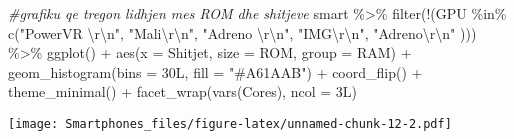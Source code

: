 \documentclass[
]{article}
\newenvironment{Shaded}{\begin{snugshade}}{\end{snugshade}}
\newcommand{\AttributeTok}[1]{\textcolor[rgb]{0.77,0.63,0.00}{#1}}
\newcommand{\CommentTok}[1]{\textcolor[rgb]{0.56,0.35,0.01}{\textit{#1}}}
\newcommand{\FunctionTok}[1]{\textcolor[rgb]{0.00,0.00,0.00}{#1}}
\newcommand{\NormalTok}[1]{#1}
\newcommand{\SpecialCharTok}[1]{\textcolor[rgb]{0.00,0.00,0.00}{#1}}
\newcommand{\StringTok}[1]{\textcolor[rgb]{0.31,0.60,0.02}{#1}}
\begin{document}
\begin{Shaded}
\begin{Highlighting}[]
\CommentTok{\#grafiku qe tregon lidhjen mes ROM dhe shitjeve}
\NormalTok{smart }\SpecialCharTok{\%\textgreater{}\%}
 \FunctionTok{filter}\NormalTok{(}\SpecialCharTok{!}\NormalTok{(GPU }\SpecialCharTok{\%in\%} \FunctionTok{c}\NormalTok{(}\StringTok{"PowerVR }\SpecialCharTok{\textbackslash{}r\textbackslash{}n}\StringTok{"}\NormalTok{, }\StringTok{"Mali}\SpecialCharTok{\textbackslash{}r\textbackslash{}n}\StringTok{"}\NormalTok{, }\StringTok{"Adreno }\SpecialCharTok{\textbackslash{}r\textbackslash{}n}\StringTok{"}\NormalTok{, }\StringTok{"IMG}\SpecialCharTok{\textbackslash{}r\textbackslash{}n}\StringTok{"}\NormalTok{, }\StringTok{"Adreno}\SpecialCharTok{\textbackslash{}r\textbackslash{}n}\StringTok{"}
\NormalTok{))) }\SpecialCharTok{\%\textgreater{}\%}
 \FunctionTok{ggplot}\NormalTok{() }\SpecialCharTok{+}
 \FunctionTok{aes}\NormalTok{(}\AttributeTok{x =}\NormalTok{ Shitjet, }\AttributeTok{size =}\NormalTok{ ROM, }\AttributeTok{group =}\NormalTok{ RAM) }\SpecialCharTok{+}
 \FunctionTok{geom\_histogram}\NormalTok{(}\AttributeTok{bins =}\NormalTok{ 30L, }\AttributeTok{fill =} \StringTok{"\#A61AAB"}\NormalTok{) }\SpecialCharTok{+}
 \FunctionTok{coord\_flip}\NormalTok{() }\SpecialCharTok{+}
 \FunctionTok{theme\_minimal}\NormalTok{() }\SpecialCharTok{+}
 \FunctionTok{facet\_wrap}\NormalTok{(}\FunctionTok{vars}\NormalTok{(Cores), }\AttributeTok{ncol =}\NormalTok{ 3L)}
\end{Highlighting}
\end{Shaded}

\texttt{[image: Smartphones\_files/figure-latex/unnamed-chunk-12-2.pdf]}
\end{document}
